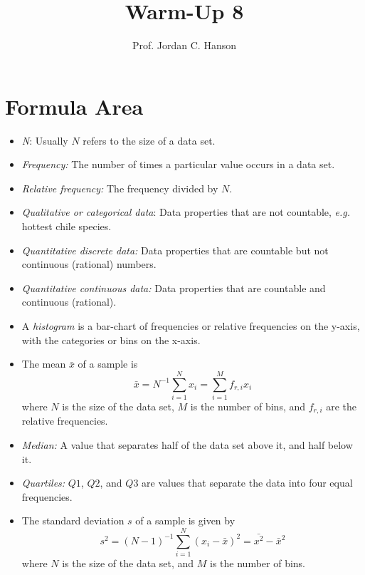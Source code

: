 \documentclass{article}
\begin{document}
\title{Warm-Up 8}
\author{Prof. Jordan C. Hanson}

\maketitle

\section{Formula Area}

\begin{itemize}
\item \textit{N}: Usually $N$ refers to the size of a data set.
\item \textit{Frequency:} The number of times a particular value occurs in a data set.
\item \textit{Relative frequency:} The frequency divided by $N$.
\item \textit{Qualitative or categorical data}: Data properties that are not countable, \textit{e.g.} hottest chile species.
\item \textit{Quantitative discrete data:} Data properties that are countable but not continuous (rational) numbers.
\item \textit{Quantitative continuous data:} Data properties that are countable and continuous (rational).
\item A \textit{histogram} is a bar-chart of frequencies or relative frequencies on the y-axis, with the categories or bins on the x-axis.
\item The mean $\bar{x}$ of a sample is 
\begin{equation}
\bar{x} = N^{-1} \sum_{i=1}^N x_i = \sum_{i=1}^M f_{r,i} x_i
\end{equation}
where $N$ is the size of the data set, $M$ is the number of bins, and $f_{r,i}$ are the relative frequencies.
\item \textit{Median:} A value that separates half of the data set above it, and half below it.
\item \textit{Quartiles:} $Q1$, $Q2$, and $Q3$ are values that separate the data into four equal frequencies.
\item The standard deviation $s$ of a sample is given by
\begin{equation}
s^2 = (N-1)^{-1} \sum_{i=1}^N (x_i-\bar{x})^2 = \bar{x^2} - \bar{x}^2
\end{equation}
where $N$ is the size of the data set, and $M$ is the number of bins.
\end{itemize}
\end{document}
